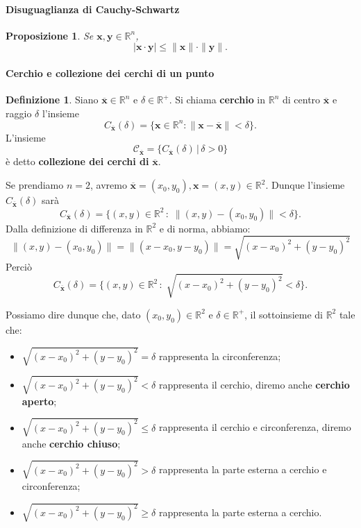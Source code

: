 \documentclass{article}
\theoremstyle{plain}
\newtheorem{prop}[thm]{Proposizione}
\theoremstyle{definition}
\newtheorem{defn}{Definizione}[section]
\theoremstyle{remark}
\begin{document}
\vspace{10pt}

\paragraph{Disuguaglianza di Cauchy-Schwartz}
\begin{bxthm}
\begin{prop}
    Se $\mathbf{x},\mathbf{y}\in\mathbb{R}^n$, \[|\mathbf{x}\cdot \mathbf{y}|\leq \|\mathbf{x}\|\cdot\|\mathbf{y}\|.\]
\end{prop}
\end{bxthm}

\vspace{10pt}


\paragraph{Cerchio e collezione dei cerchi di un punto}
\begin{bxthm}
\begin{defn}
    Siano $\overline{\mathbf{x}}\in\mathbb{R}^n$ e $\delta\in\mathbb{R}^+$. 
    Si chiama \textbf{cerchio} in $\mathbb{R}^n$ di centro $\overline{\mathbf{x}}$ e raggio $\delta$ l'insieme 
    \[C_{\overline{\mathbf{x}}}(\delta)=\{\mathbf{x}\in\mathbb{R}^n:\|\mathbf{x}-\overline{\mathbf{x}}\|<\delta\}.\]
    L'insieme \[\mathcal{C}_{\overline{\mathbf{x}}}=\{C_{\overline{\mathbf{x}}}(\delta) \,|\, \delta>0\}\] è detto \textbf{collezione dei cerchi di} $\overline{\mathbf{x}}$.
\end{defn}
\end{bxthm}

\vspace{10pt}

Se prendiamo $n=2$, avremo $\overline{\mathbf{x}}=(x_0,y_0), \mathbf{x}=(x,y)\in\mathbb{R}^2$. 
Dunque l'insieme $C_{\overline{\mathbf{x}}}(\delta)$ sarà
\[C_{\overline{\mathbf{x}}}(\delta)=\{(x,y)\in\mathbb{R}^2\,:\;\|(x,y)-(x_0,y_0)\|<\delta\}.\]
Dalla definizione di differenza in $\mathbb{R}^2$ e di norma, abbiamo:
\[\|(x,y)-(x_0,y_0)\|=\|(x-x_0,y-y_0)\|=\sqrt{(x-x_0)^2+(y-y_0)^2}\]
Perciò
\[C_{\overline{\mathbf{x}}}(\delta)=\{(x,y)\in\mathbb{R}^2\,:\;\sqrt{(x-x_0)^2+(y-y_0)^2}<\delta\}.\]

Possiamo dire dunque che, dato $(x_0,y_0)\in\mathbb{R}^2$ e $\delta\in\mathbb{R}^+$, il sottoinsieme di $\mathbb{R}^2$ tale che:
\begin{itemize}
    \item $\sqrt{(x-x_0)^2+(y-y_0)^2}=\delta$ rappresenta la circonferenza;
    \item $\sqrt{(x-x_0)^2+(y-y_0)^2}<\delta$ rappresenta il cerchio, diremo anche \textbf{cerchio aperto};
    \item $\sqrt{(x-x_0)^2+(y-y_0)^2}\leq \delta$ rappresenta il cerchio e circonferenza, diremo anche \textbf{cerchio chiuso};
    \item $\sqrt{(x-x_0)^2+(y-y_0)^2}> \delta$ rappresenta la parte esterna a cerchio e circonferenza;
    \item $\sqrt{(x-x_0)^2+(y-y_0)^2}\geq \delta$ rappresenta la parte esterna a cerchio.
\end{itemize}
\end{document}
